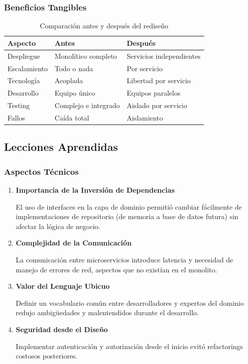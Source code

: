 \documentclass[12pt,a4paper]{article}
\begin{document}
\subsubsection{Beneficios Tangibles}

\begin{table}[H]
\centering
\begin{tabular}{|p{5cm}|p{4cm}|p{5cm}|}
\hline
\textbf{Aspecto} & \textbf{Antes} & \textbf{Después} \\
\hline
Despliegue & Monolítico completo & Servicios independientes \\
\hline
Escalamiento & Todo o nada & Por servicio \\
\hline
Tecnología & Acoplada & Libertad por servicio \\
\hline
Desarrollo & Equipo único & Equipos paralelos \\
\hline
Testing & Complejo e integrado & Aislado por servicio \\
\hline
Fallos & Caída total & Aislamiento \\
\hline
\end{tabular}
\caption{Comparación antes y después del rediseño}
\end{table}

\subsection{Lecciones Aprendidas}

\subsubsection{Aspectos Técnicos}

\begin{enumerate}[leftmargin=*]
    \item \textbf{Importancia de la Inversión de Dependencias}

    El uso de interfaces en la capa de dominio permitió cambiar fácilmente de implementaciones de repositorio (de memoria a base de datos futura) sin afectar la lógica de negocio.

    \item \textbf{Complejidad de la Comunicación}

    La comunicación entre microservicios introduce latencia y necesidad de manejo de errores de red, aspectos que no existían en el monolito.

    \item \textbf{Valor del Lenguaje Ubicuo}

    Definir un vocabulario común entre desarrolladores y expertos del dominio redujo ambigüedades y malentendidos durante el desarrollo.

    \item \textbf{Seguridad desde el Diseño}

    Implementar autenticación y autorización desde el inicio evitó refactorings costosos posteriores.
\end{enumerate}
\end{document}
